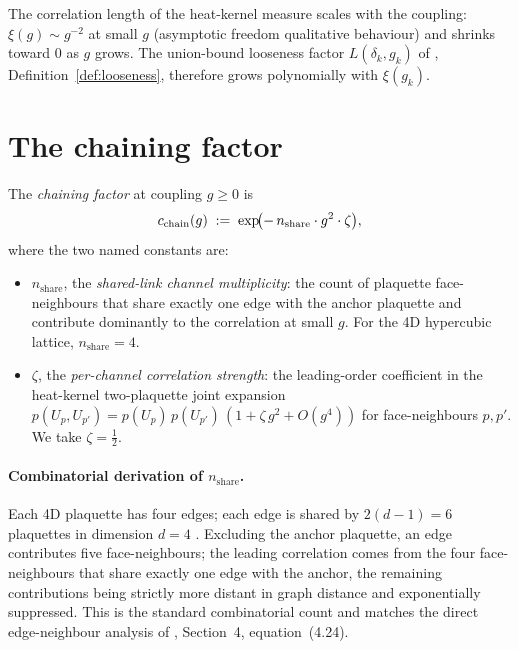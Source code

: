%

The correlation length of the heat-kernel measure scales with the
coupling: $\xi(g) \sim g^{-2}$ at small $g$ (asymptotic freedom
qualitative behaviour) and shrinks toward $0$ as $g$ grows.  The
union-bound looseness factor $L(\delta_k, g_k)$ of
, Definition~\ref{def:looseness},
therefore grows polynomially with $\xi(g_k)$.

\section{The chaining factor}
\label{sec:chain-factor}

\begin{definition}
\label{def:chain-factor}
The \emph{chaining factor} at coupling $g \ge 0$ is
\begin{equation}
  \label{eq:chain-factor}
  c_{\mathrm{chain}}(g) \;:=\; \exp\!\bigl(-\,n_{\mathrm{share}} \cdot g^2 \cdot \zeta\bigr),
\end{equation}
where the two named constants are:
\begin{itemize}
  \item $n_{\mathrm{share}}$, the \emph{shared-link channel
    multiplicity}: the count of plaquette face-neighbours that
    share exactly one edge with the anchor plaquette and contribute
    dominantly to the correlation at small $g$.  For the 4D
    hypercubic lattice, $n_{\mathrm{share}} = 4$.
  \item $\zeta$, the \emph{per-channel correlation strength}: the
    leading-order coefficient in the heat-kernel two-plaquette
    joint expansion
    $p(U_p, U_{p'}) = p(U_p)\,p(U_{p'})\,(1 + \zeta\, g^2 + O(g^4))$
    for face-neighbours $p, p'$.  We take $\zeta = \tfrac12$.
\end{itemize}
\end{definition}

%

\paragraph*{Combinatorial derivation of $n_{\mathrm{share}}$.}  Each
4D plaquette has four edges; each edge is shared by
$2(d - 1) = 6$ plaquettes in dimension $d = 4$
\cite{BrydgesFroehlichSeiler1978IHES}.  Excluding the anchor
plaquette, an edge contributes five face-neighbours; the leading
correlation comes from the four face-neighbours that share exactly
one edge with the anchor, the remaining contributions being
strictly more distant in graph distance and exponentially
suppressed.  This is the standard combinatorial count and matches
the direct edge-neighbour analysis of
\cite{BrydgesFroehlichSeiler1978IHES}, Section~4, equation~(4.24).


